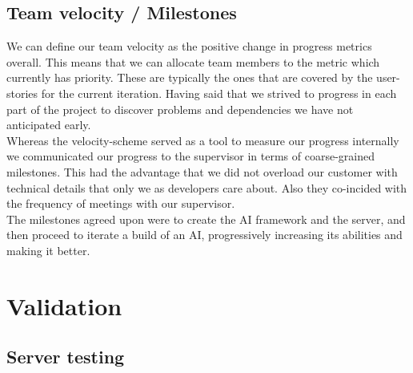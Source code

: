 \documentclass[pdftex,11pt,a4paper]{report}
\begin{document}
\subsection{Team velocity / Milestones}
We can define our team velocity as the positive change in progress
metrics overall.  This means that we can allocate team members to the
metric which currently has priority. These are typically the ones that
are covered by the user-stories for the current iteration. Having said
that we strived to progress in each part of the project to discover
problems and dependencies we have not anticipated early.  \\ Whereas
the velocity-scheme served as a tool to measure our progress
internally we communicated our progress to the supervisor in terms of
coarse-grained milestones. This had the advantage that we did not
overload our customer with technical details that only we as
developers care about. Also they co-incided with the frequency of
meetings with our supervisor.  \\ The milestones agreed upon were to
create the AI framework and the server, and then proceed to iterate a
build of an AI, progressively increasing its abilities and making it
better.


\pagebreak

\section{Validation}

\subsection{Server testing}
\end{document}
